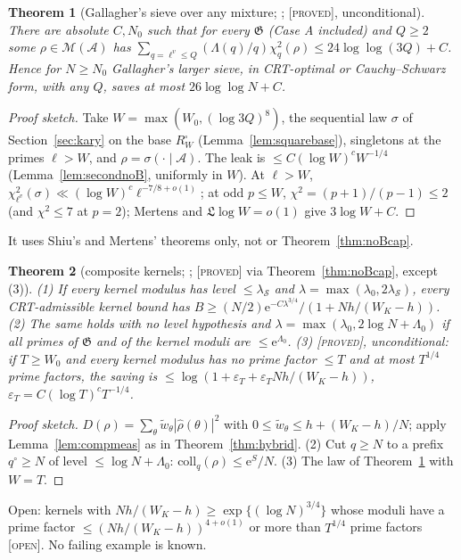\documentclass[10pt,reqno]{amsart}
\newtheorem{theorem}{Theorem}[section]
\theoremstyle{definition}
\theoremstyle{remark}
\newcommand{\A}{\mathcal A}
\newcommand{\cG}{\mathfrak G}
\newcommand{\e}{\mathrm e}
\newcommand{\lab}[1]{\textup{[\textsc{#1}]}}
\begin{document}
\begin{theorem}[Gallagher's sieve over any mixture; {\cite[Thm~4.3]{LS2}}; \lab{proved}, unconditional]\label{thm:gallagher}
There are absolute $C,N_0$ such that for every $\cG$ (Case A included) and
$Q\geq2$ some $\rho\in\mathcal M(\A)$ has
$\sum_{q=\ell^v\leq Q}(\Lambda(q)/q)\chi^2_q(\rho)\leq24\log\log(3Q)+C$.  Hence for $N\geq N_0$
Gallagher's larger sieve, in CRT-optimal or Cauchy--Schwarz form, with any
$Q$, saves at most $26\log\log N+C$.
\end{theorem}
\begin{proof}[Proof sketch]
Take $W=\max(W_0,(\log3Q)^8)$, the sequential law $\sigma$ of
Section~\ref{sec:kary} on the base $R_W^\square$ (Lemma~\ref{lem:squarebase}),
singletons at the primes $\ell>W$, and $\rho=\sigma(\cdot\mid\A)$.  The leak is
$\leq C(\log W)^cW^{-1/4}$ (Lemma~\ref{lem:secondnoB}, uniformly in $W$).  At $\ell>W$,
$\chi^2_{\ell^v}(\sigma)\ll(\log W)^c\ell^{-7/8+o(1)}$; at odd $p\leq W$, $\chi^2=(p+1)/(p-1)\leq2$ (and
$\chi^2\leq7$ at $p=2$); Mertens and $\mathfrak L\log W=o(1)$ give $3\log W+C$.
\end{proof}
It uses Shiu's and Mertens' theorems only, not \cite{ElsholtzTao} or
Theorem~\ref{thm:noBcap}.

\begin{theorem}[composite kernels; {\cite[Thms~4.2, 9.1, Prop.~9.2]{LS2}}; \lab{proved} via Theorem~\ref{thm:noBcap}, except (3)]\label{thm:compkernel}
(1) If every kernel modulus has level $\leq\lambda_{\mathcal S}$ and
$\lambda=\max(\lambda_0,2\lambda_{\mathcal S})$, every CRT-admissible kernel bound has
$B\geq(N/2)\e^{-C\lambda^{3/4}}/(1+Nh/(W_K-h))$.
(2) The same holds with no level hypothesis and $\lambda=\max(\lambda_0,2\log N+\Lambda_0)$
if all primes of $\cG$ and of the kernel moduli are $\leq\e^{\Lambda_0}$.
(3) \lab{proved}, unconditional: if $T\geq W_0$ and every kernel modulus has
no prime factor $\leq T$ and at most $T^{1/4}$ prime factors, the saving is
$\leq\log(1+\varepsilon_T+\varepsilon_TNh/(W_K-h))$, $\varepsilon_T=C(\log T)^cT^{-1/4}$.
\end{theorem}
\begin{proof}[Proof sketch]
$D(\rho)=\sum_\theta\tilde w_\theta|\hat\rho(\theta)|^2$ with $0\leq\tilde w_\theta\leq h+(W_K-h)/N$; apply
Lemma~\ref{lem:compmeas} as in Theorem~\ref{thm:hybrid}.  (2) Cut $q\geq N$ to a
prefix $q^\circ\geq N$ of level $\leq\log N+\Lambda_0$: $\mathrm{coll}_q(\rho)\leq\e^S/N$.  (3) The
law of Theorem~\ref{thm:gallagher} with $W=T$.
\end{proof}
Open: kernels with $Nh/(W_K-h)\geq\exp\{(\log N)^{3/4}\}$ whose moduli have a
prime factor $\leq(Nh/(W_K-h))^{4+o(1)}$ or more than $T^{1/4}$ prime factors
\lab{open}.  No failing example is known.
\end{document}
